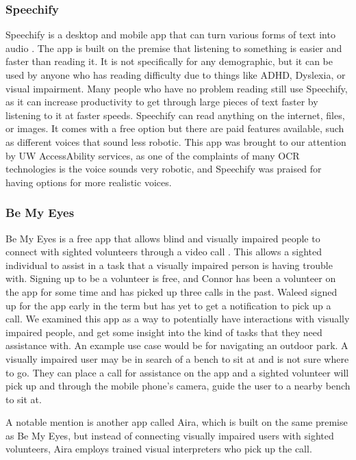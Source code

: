 \documentclass[a4paper,11pt]{article}
\begin{document}
\subsubsection{Speechify}
Speechify is a desktop and mobile app that can turn various forms of text into audio \cite{speechify}. The app is built on the premise that listening to something is easier and faster than reading it. It is not specifically for any demographic, but it can be used by anyone who has reading difficulty due to things like ADHD, Dyslexia, or visual impairment. Many people who have no problem reading still use Speechify, as it can increase productivity to get through large pieces of text faster by listening to it at faster speeds. Speechify can read anything on the internet, files, or images. It comes with a free option but there are paid features available, such as different voices that sound less robotic. This app was brought to our attention by UW AccessAbility services, as one of the complaints of many OCR technologies is the voice sounds very robotic, and Speechify was praised for having options for more realistic voices.

\subsubsection{Be My Eyes}
Be My Eyes is a free app that allows blind and visually impaired people to connect with sighted volunteers through a video call \cite{be-my-eyes}. This allows a sighted individual to assist in a task that a visually impaired person is having trouble with. Signing up to be a volunteer is free, and Connor has been a volunteer on the app for some time and has picked up three calls in the past. Waleed signed up for the app early in the term but has yet to get a notification to pick up a call. We examined this app as a way to potentially have interactions with visually impaired people, and get some insight into the kind of tasks that they need assistance with. An example use case would be for navigating an outdoor park. A visually impaired user may be in search of a bench to sit at and is not sure where to go. They can place a call for assistance on the app and a sighted volunteer will pick up and through the mobile phone's camera, guide the user to a nearby bench to sit at.

A notable mention is another app called Aira, which is built on the same premise as Be My Eyes, but instead of connecting visually impaired users with sighted volunteers, Aira employs trained visual interpreters who pick up the call.
\end{document}
